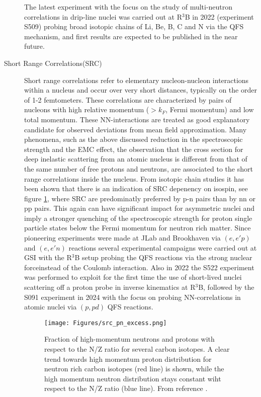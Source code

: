 \begin{description}
The latest experiment with the focus on the study of multi-neutron correlations in drip-line nuclei was carried out at R$^3$B in 2022 (experiment S509) probing broad isotopic chains of Li, Be, B, C and N via the QFS mechanism, and first results are expected to be published in the near future.
\item[Short Range Correlations(SRC)]Short range correlations refer to elementary nucleon-nucleon interactions within a nucleus and occur over very short distances, typically on the order of 1-2 femtometers.  These correlations are characterized by pairs of nucleons with high relative momentum ($> k_F$, Fermi momentum) and low total momentum. These NN-interactions are treated as good explanatory candidate for observed deviations from mean field approximation. Many phenomena, such as the above discussed reduction in the spectroscopic strength and the EMC effect\cite{xing2023electromagnetic}, the observation that  the cross section for deep inelastic scattering from an atomic nucleus is different from that of the same number of free protons and neutrons, are associated to the short range correlations inside the nucleus.\newline
From isotopic chain studies\cite{clas2018probing} it has been shown that there is an indication of SRC depenency on isospin, see figure \ref{fig:src_pairs}, where SRC are predominatly preferred by p-n pairs than by nn or pp pairs. This again can have significant impact for asymmetric nuclei and imply a stronger quenching of the spectroscopic strength for proton single particle states below the Fermi momentum for neutron rich matter.\newline  
Since pioneering experiments were made at JLab and Brookhaven via $(e,e'p)$ and $(e,e'n)$ reactions several  experimental campaigns were carried out at GSI with the R$^3$B setup probing the QFS reactions via the strong nuclear forceinstead of the Coulomb interaction. Also in 2022 the S522 experiment was performed to exploit for the first time the use of short-lived nuclei scattering off a proton probe in inverse kinematics at R$^3$B, followed by the S091 experiment in 2024 with the focus on probing NN-correlations in atomic nuclei via $(p,pd)$ QFS reactions\cite{paschalis2020nucleon}. 
\begin{figure}[htpb]
    \centering
    \texttt{[image: Figures/src\_pn\_excess.png]}
    \caption{
   	Fraction of high-momentum neutrons and protons with respect to the N/Z ratio for several carbon isotopes. A clear trend towards high momentum proton distribution for neutron rich carbon isotopes (red line) is shown, while the high momentum neutron distribution stays constant wiht respect to the N/Z ratio (blue line). From reference \cite{clas2018probing}. 
    }
    \label{fig:src_pairs}
\end{figure}


\end{description}
